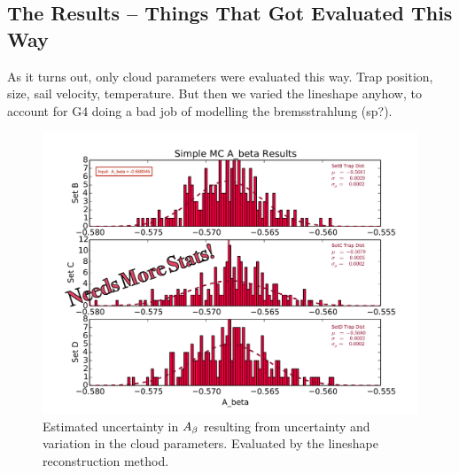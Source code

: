 	\subsection{The Results -- Things That Got Evaluated This Way}
	As it turns out, only cloud parameters were evaluated this way. 
Trap position, size, sail velocity, temperature.  But then we varied the lineshape anyhow, to account for G4 doing a bad job of modelling the bremsstrahlung (sp?).
	
	    \begin{figure}[h!!]
    	\centering
    	\includegraphics[width=.999\linewidth]
    	{Figures/Position_Err_Abeta_prelim.pdf}
    	\caption[$\Abeta$ Position Error]{Estimated uncertainty in $\Abeta$ resulting from uncertainty and variation in the cloud parameters.  Evaluated by the lineshape reconstruction method.}	
    	\label{fig:Abeta_position_err}
		\end{figure}

